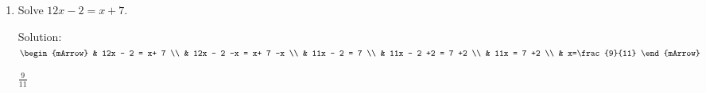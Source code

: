 \noindent%
\begin{enumerate}
    \item Solve $12x - 2 = x+ 7$.
	    \begin{exercise} 
            \begin{envSolution}
		        Solution:\\[0.5cm]
                    $\begin{mArrow}
                                  &  12x - 2 = x+ 7     \\
							      &  12x - 2 -x = x+ 7 -x        \\
     						      &  11x - 2  =  7                     \\ 
             					  &  11x - 2 +2   =  7 +2         \\
								  &  11x    =  7 +2          \\
								  & x=\frac{9}{11}
					 \end{mArrow}$			   
                     \begin{shortsolution}  
				           $  \frac{9}{11} $
			         \end{shortsolution}				 
            \end{envSolution}
        \end{exercise}
	

\end{enumerate}
